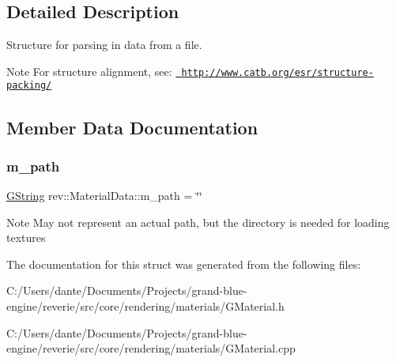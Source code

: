 \subsection{Detailed Description}
Structure for parsing in data from a file. 

\begin{DoxyNote}{Note}
For structure alignment, see\+: \href{http://www.catb.org/esr/structure-packing/}{\texttt{ http\+://www.\+catb.\+org/esr/structure-\/packing/}} 
\end{DoxyNote}


\subsection{Member Data Documentation}
\mbox{\label{structrev_1_1_material_data_ac54dbbf36395be2c78d641d06c3df440}} 
\subsubsection{\texorpdfstring{m\_path}{m\_path}}
{\footnotesize\ttfamily \mbox{\hyperlink{classrev_1_1_g_string}{G\+String}} rev\+::\+Material\+Data\+::m\+\_\+path = \char`\"{}\char`\"{}}

\begin{DoxyNote}{Note}
May not represent an actual path, but the directory is needed for loading textures 
\end{DoxyNote}


The documentation for this struct was generated from the following files\+:\begin{DoxyCompactItemize}
\item 
C\+:/\+Users/dante/\+Documents/\+Projects/grand-\/blue-\/engine/reverie/src/core/rendering/materials/G\+Material.\+h\item 
C\+:/\+Users/dante/\+Documents/\+Projects/grand-\/blue-\/engine/reverie/src/core/rendering/materials/G\+Material.\+cpp\end{DoxyCompactItemize}
